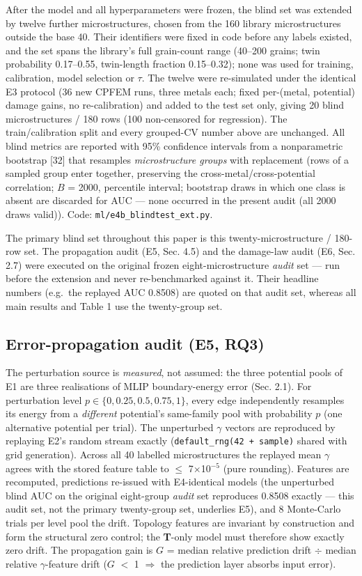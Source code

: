 \documentclass[12pt]{article}
\begin{document}
After the model and all hyperparameters were frozen, the blind set was extended by twelve further microstructures, chosen from the 160 library microstructures outside the base 40. Their identifiers were fixed in code before any labels existed, and the set spans the library's full grain-count range (40--200 grains; twin probability 0.17--0.55, twin-length fraction 0.15--0.32); none was used for training, calibration, model selection or $\tau$. The twelve were re-simulated under the identical E3 protocol (36 new CPFEM runs, three metals each; fixed per-(metal, potential) damage gains, no re-calibration) and added to the test set only, giving 20 blind microstructures / 180 rows (100 non-censored for regression). The train/calibration split and every grouped-CV number above are unchanged. All blind metrics are reported with 95\% confidence intervals from a nonparametric bootstrap [32] that resamples \textit{microstructure groups} with replacement (rows of a sampled group enter together, preserving the cross-metal/cross-potential correlation; $B$ = 2000, percentile interval; bootstrap draws in which one class is absent are discarded for AUC --- none occurred in the present audit (all 2000 draws valid)). Code: \texttt{ml/e4b\_blindtest\_ext.py}.

The primary blind set throughout this paper is this twenty-microstructure / 180-row set. The propagation audit (E5, Sec. 4.5) and the damage-law audit (E6, Sec. 2.7) were executed on the original frozen eight-microstructure \textit{audit} set --- run before the extension and never re-benchmarked against it. Their headline numbers (e.g.\ the replayed AUC 0.8508) are quoted on that audit set, whereas all main results and Table 1 use the twenty-group set.

\subsection{Error-propagation audit (E5, RQ3)}

The perturbation source is \textit{measured}, not assumed: the three potential pools of E1 are three realisations of MLIP boundary-energy error (Sec. 2.1). For perturbation level $p \in \{0, 0.25, 0.5, 0.75, 1\}$, every edge independently resamples its energy from a \textit{different} potential's same-family pool with probability $p$ (one alternative potential per trial). The unperturbed $\gamma$ vectors are reproduced by replaying E2's random stream exactly (\texttt{default\_rng(42 + sample)} shared with grid generation). Across all 40 labelled microstructures the replayed mean $\gamma$ agrees with the stored feature table to $\le$ 7$\times$10$^{-5}$ (pure rounding). Features are recomputed, predictions re-issued with E4-identical models (the unperturbed blind AUC on the original eight-group \textit{audit} set reproduces 0.8508 exactly --- this audit set, not the primary twenty-group set, underlies E5), and 8 Monte-Carlo trials per level pool the drift. Topology features are invariant by construction and form the structural zero control; the \textbf{T}-only model must therefore show exactly zero drift. The propagation gain is $G$ = median relative prediction drift $\div$ median relative $\gamma$-feature drift ($G$ $<$ 1 $\Rightarrow$ the prediction layer absorbs input error).
\end{document}
